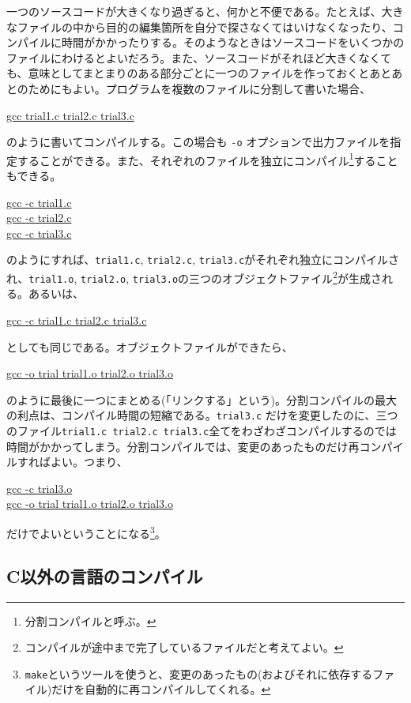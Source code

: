 一つのソースコードが大きくなり過ぎると、何かと不便である。たとえば、大きなファイルの中から目的の編集箇所を自分で探さなくてはいけなくなったり、コンパイルに時間がかかったりする。そのようなときはソースコードをいくつかのファイルにわけるとよいだろう。また、ソースコードがそれほど大きくなくても、意味としてまとまりのある部分ごとに一つのファイルを作っておくとあとあとのためにもよい。プログラムを複数のファイルに分割して書いた場合、
\begin{commandline2}
\prompt \underline{gcc trial1.c trial2.c trial3.c}
\end{commandline2} \noindent
のように書いてコンパイルする。この場合も {\tt -o} オプションで出力ファイルを指定することができる。また、それぞれのファイルを独立にコンパイル\footnote{分割コンパイルと呼ぶ。}することもできる。
\begin{commandline2}
\prompt \underline{gcc -c trial1.c} \\
\prompt \underline{gcc -c trial2.c} \\
\prompt \underline{gcc -c trial3.c}
\end{commandline2} \noindent
のようにすれば、{\tt trial1.c}, {\tt trial2.c}, {\tt trial3.c}がそれぞれ独立にコンパイルされ、{\tt trial1.o}, {\tt trial2.o}, {\tt trial3.o}の三つのオブジェクトファイル\footnote{コンパイルが途中まで完了しているファイルだと考えてよい。}が生成される。あるいは、
\begin{commandline2}
\prompt \underline{gcc -c trial1.c trial2.c trial3.c}
\end{commandline2} \noindent
としても同じである。オブジェクトファイルができたら、
\begin{commandline2}
\prompt \underline{gcc -o trial trial1.o trial2.o trial3.o}
\end{commandline2} \noindent
のように最後に一つにまとめる(「リンクする」という)。分割コンパイルの最大の利点は、コンパイル時間の短縮である。{\tt trial3.c} だけを変更したのに、三つのファイル{\tt trial1.c trial2.c trial3.c}全てをわざわざコンパイルするのでは時間がかかってしまう。分割コンパイルでは、変更のあったものだけ再コンパイルすればよい。つまり、
\begin{commandline2}
\prompt \underline{gcc -c trial3.o} \\
\prompt \underline{gcc -o trial trial1.o trial2.o trial3.o}
\end{commandline2} \noindent
だけでよいということになる\footnote{{\tt make}というツールを使うと、変更のあったもの(およびそれに依存するファイル)だけを自動的に再コンパイルしてくれる。}。

\subsection{C以外の言語のコンパイル}

